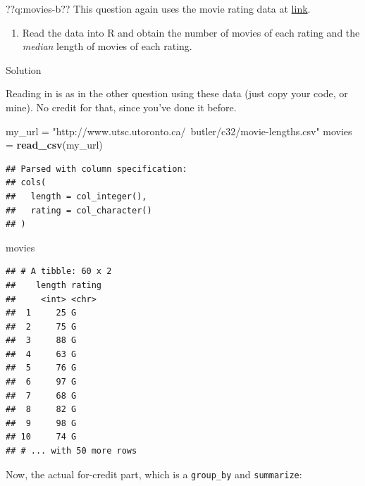 \documentclass[]{tufte-book}
\newenvironment{Shaded}{}{}
\newcommand{\DataTypeTok}[1]{\textcolor[rgb]{0.56,0.13,0.00}{#1}}
\newcommand{\KeywordTok}[1]{\textcolor[rgb]{0.00,0.44,0.13}{\textbf{#1}}}
\newcommand{\NormalTok}[1]{#1}
\newcommand{\OperatorTok}[1]{\textcolor[rgb]{0.40,0.40,0.40}{#1}}
\newcommand{\StringTok}[1]{\textcolor[rgb]{0.25,0.44,0.63}{#1}}
\providecommand{\tightlist}{%
  \setlength{\itemsep}{0pt}\setlength{\parskip}{0pt}}
\theoremstyle{definition}
\theoremstyle{definition}
\theoremstyle{definition}
\theoremstyle{remark}
\begin{document}
??q:movies-b?? This question again uses the movie rating data at
\href{http://www.utsc.utoronto.ca/~butler/c32/movie-lengths.csv}{link}.

\begin{enumerate}
\def\labelenumi{(\alph{enumi})}
\tightlist
\item
  Read the data into R and obtain the number of movies of each rating
  and the \emph{median} length of movies of each rating.
\end{enumerate}

Solution

Reading in is as in the other question using these data (just copy your
code, or mine). No credit for that, since you've done it before.

\begin{Shaded}
\begin{Highlighting}[]
\NormalTok{my_url =}\StringTok{ "http://www.utsc.utoronto.ca/~butler/c32/movie-lengths.csv"}
\NormalTok{movies =}\StringTok{ }\KeywordTok{read_csv}\NormalTok{(my_url)}
\end{Highlighting}
\end{Shaded}

\begin{verbatim}
## Parsed with column specification:
## cols(
##   length = col_integer(),
##   rating = col_character()
## )
\end{verbatim}

\begin{Shaded}
\begin{Highlighting}[]
\NormalTok{movies}
\end{Highlighting}
\end{Shaded}

\begin{verbatim}
## # A tibble: 60 x 2
##    length rating
##     <int> <chr> 
##  1     25 G     
##  2     75 G     
##  3     88 G     
##  4     63 G     
##  5     76 G     
##  6     97 G     
##  7     68 G     
##  8     82 G     
##  9     98 G     
## 10     74 G     
## # ... with 50 more rows
\end{verbatim}

Now, the actual for-credit part, which is a \texttt{group\_by} and
\texttt{summarize}:

\begin{Shaded}
\end{Shaded}
\end{document}
